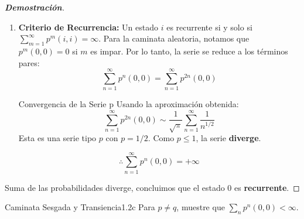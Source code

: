 \documentclass[10pt,a4paper]{article}
\begin{document}
\begin{proof}[\textbf{Demostración}]
\begin{enumerate}
        Sustituyendo en la probabilidad $p^{2n}(0,0)$:
        \[ p^{2n}(0,0) \sim \frac{1}{4^n} \left( \frac{4^n}{\sqrt{\pi n}} \right) = \frac{1}{\sqrt{\pi n}} = (\pi n)^{-1/2} \]

        \item \textbf{Criterio de Recurrencia:}
        Un estado $i$ es recurrente si y solo si $\sum_{m=1}^{\infty} p^m(i,i) = \infty$. 
        Para la caminata aleatoria, notamos que $p^m(0,0) = 0$ si $m$ es impar. Por lo tanto, la serie se reduce a los términos pares:
        \[ \sum_{n=1}^{\infty} p^n(0,0) = \sum_{n=1}^{\infty} p^{2n}(0,0) \]

        \begin{alerta}{Convergencia de la Serie p}
            Usando la aproximación obtenida:
            \[ \sum_{n=1}^{\infty} p^{2n}(0,0) \sim \frac{1}{\sqrt{\pi}} \sum_{n=1}^{\infty} \frac{1}{n^{1/2}} \]
            Esta es una serie tipo $p$ con $p = 1/2$. Como $p \leq 1$, la serie \textbf{diverge}.
        \end{alerta}

        \[ \therefore \sum_{n=1}^{\infty} p^n(0,0) = +\infty \]
    \end{enumerate}
    
   Suma de las probabilidades diverge, concluimos que el estado $0$ es \textbf{recurrente}.
\end{proof}

\newpage

\begin{ejercicio}{Caminata Sesgada y Transiencia}{1.2c}
    Para $p \neq q$, muestre que $\sum_n p^n(0,0) < \infty$.
\end{ejercicio}
\end{document}
